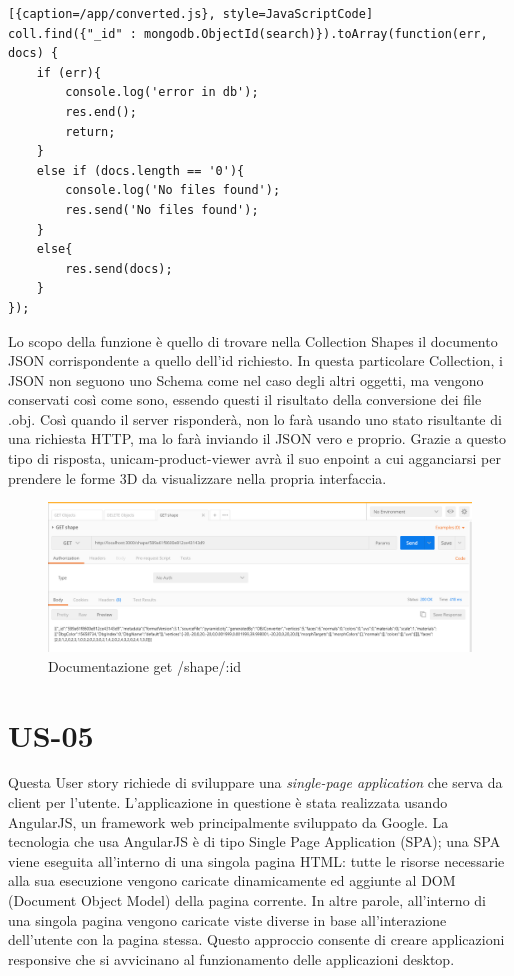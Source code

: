 \begin{lstlisting}[{caption=/app/converted.js}, style=JavaScriptCode]
coll.find({"_id" : mongodb.ObjectId(search)}).toArray(function(err, docs) {
	if (err){
		console.log('error in db');
		res.end();
		return;
	}
	else if (docs.length == '0'){
		console.log('No files found');
		res.send('No files found');
	}
	else{
		res.send(docs);
	}
});
\end{lstlisting}
Lo scopo della funzione è quello di trovare nella Collection Shapes il documento JSON corrispondente a quello dell'id richiesto. In questa particolare Collection, i JSON non seguono uno Schema come nel caso degli altri oggetti, ma vengono conservati così come sono, essendo questi il risultato della conversione dei file .obj. Così quando il server risponderà, non lo farà usando uno stato risultante di una richiesta HTTP, ma lo farà inviando il JSON vero e proprio. Grazie a questo tipo di risposta, unicam-product-viewer avrà il suo enpoint a cui agganciarsi per prendere le forme 3D da visualizzare nella propria interfaccia.
\begin{figure}[h]
	\centering
	\includegraphics[scale=0.42]{Immagini/get_shape.png}
	\caption{Documentazione get /shape/:id}
\end{figure}
\section{US-05}
Questa User story richiede di sviluppare una \emph{single-page application} che serva da client per l'utente. L'applicazione in questione è stata realizzata usando AngularJS\cite{angular}, un framework web principalmente sviluppato da Google. La tecnologia che usa AngularJS è di tipo Single Page Application (SPA); una SPA viene eseguita all’interno di una singola pagina HTML: tutte le risorse necessarie alla sua esecuzione vengono caricate dinamicamente ed aggiunte al DOM (Document Object Model) della pagina corrente. In altre parole, all’interno di una singola pagina vengono caricate viste diverse in base all’interazione dell’utente con la pagina stessa. Questo approccio consente di creare applicazioni responsive che si avvicinano al funzionamento delle applicazioni desktop.

